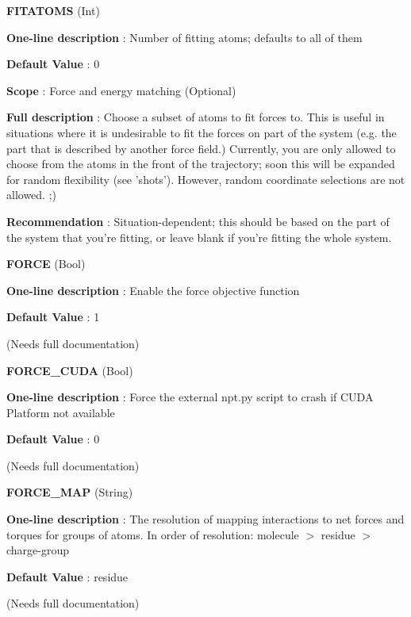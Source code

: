 \begin{DoxyItemize}
\item {\bfseries  \-F\-I\-T\-A\-T\-O\-M\-S } (\-Int) \par
{\bfseries  \-One-\/line description }\-: \-Number of fitting atoms; defaults to all of them \par
{\bfseries  \-Default \-Value }\-: 0 \par
{\bfseries  \-Scope }\-: \-Force and energy matching (\-Optional) \par
{\bfseries  \-Full description }\-: \-Choose a subset of atoms to fit forces to. \-This is useful in situations where it is undesirable to fit the forces on part of the system (e.\-g. the part that is described by another force field.) \-Currently, you are only allowed to choose from the atoms in the front of the trajectory; soon this will be expanded for random flexibility (see 'shots'). \-However, random coordinate selections are not allowed. ;) \par
{\bfseries  \-Recommendation }\-: \-Situation-\/dependent; this should be based on the part of the system that you're fitting, or leave blank if you're fitting the whole system.\end{DoxyItemize}
\begin{DoxyItemize}
\item {\bfseries  \-F\-O\-R\-C\-E } (\-Bool) \par
{\bfseries  \-One-\/line description }\-: \-Enable the force objective function \par
{\bfseries  \-Default \-Value }\-: 1 \par
(\-Needs full documentation)\end{DoxyItemize}
\begin{DoxyItemize}
\item {\bfseries  \-F\-O\-R\-C\-E\-\_\-\-C\-U\-D\-A } (\-Bool) \par
{\bfseries  \-One-\/line description }\-: \-Force the external npt.\-py script to crash if \-C\-U\-D\-A \-Platform not available \par
{\bfseries  \-Default \-Value }\-: 0 \par
(\-Needs full documentation)\end{DoxyItemize}
\begin{DoxyItemize}
\item {\bfseries  \-F\-O\-R\-C\-E\-\_\-\-M\-A\-P } (\-String) \par
{\bfseries  \-One-\/line description }\-: \-The resolution of mapping interactions to net forces and torques for groups of atoms. \-In order of resolution\-: molecule $>$ residue $>$ charge-\/group \par
{\bfseries  \-Default \-Value }\-: residue \par
(\-Needs full documentation)\end{DoxyItemize}
